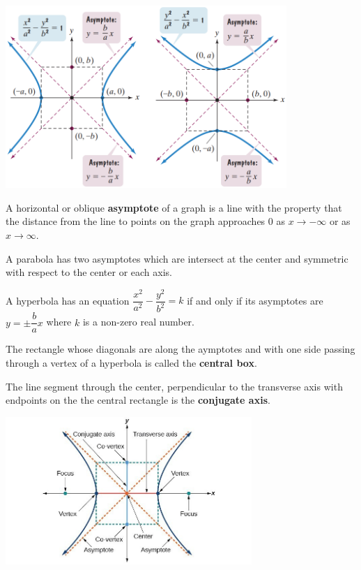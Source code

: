 \begin{center}
 \includegraphics[width=0.8\textwidth,keepaspectratio]{figs/HyperbolaGraphs.png}
\end{center}

\begin{definition}
A horizontal or oblique \textbf{asymptote} of a graph is a line with the property that the distance from the line to points on the graph approaches 0 as $x\to-\infty$ or as $x\to\infty$.
\end{definition}

A parabola has two asymptotes which are intersect at the center and symmetric with respect to the center or each axis.

\begin{proposition}
    A hyperbola has an equation $\dfrac{x^2}{a^2}-\dfrac{y^2}{b^2}=k$ if and only if its asymptotes are $y=\pm\dfrac{b}{a}x$ where $k$ is a non-zero real number.
\end{proposition}

The rectangle whose diagonals are along the aymptotes and with one side passing through a vertex of a hyperbola is called the \textbf{central box}.

The line segment through the center, perpendicular to the transverse axis with endpoints on the the central rectangle is the \textbf{conjugate axis}. 

\begin{center}
    \includegraphics[width=0.7\textwidth,keepaspectratio]{figs/KeyConceptsOfHyperbola.jpg}
\end{center}

